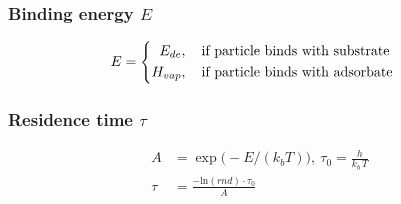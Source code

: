 \subsubsection*{Binding energy $E$}
\begin{equation}
	\label{eq:energy}
	E=
	\begin{cases}
		\begin{split}
		E_{de}&, \text{\quad if particle binds with substrate}\\
		H_{vap}&,  \text{\quad if particle binds with adsorbate}
		\end{split}
	\end{cases}
\end{equation}


\subsubsection*{Residence time $\tau$}
\begin{equation}
	\label{eq:sojourntime}
	\begin{split}
		A&=\exp\big( - E/(k_b T)\big),\ \tau_0 = \frac{h}{k_b \, T}\\
		\tau &= \frac{-\text{ln}(rnd) \cdot \tau_0}{A}
	\end{split}
\end{equation}
\begin{comment}
\subsubsection*{Step size $t_{step}$}
\begin{equation}
	\label{eq:tstep}
	\begin{split}
	t_{min}&=\text{ProblemDef::t\_min}\\
	t_{i}&=t_{min} \cdot \exp\big(\text{i}\cdot \ln(\text{ProblemDef::maxTimeS}/T_{min})/\text{ProblemDef::iterationNumber})\big)\\
	t_{step}&=\text{min}\big(t_{currentStep+1}-t_{currentStep}, \text{ProblemDef::t\_max}\big)\\
	\end{split}
\end{equation}
\end{comment}
